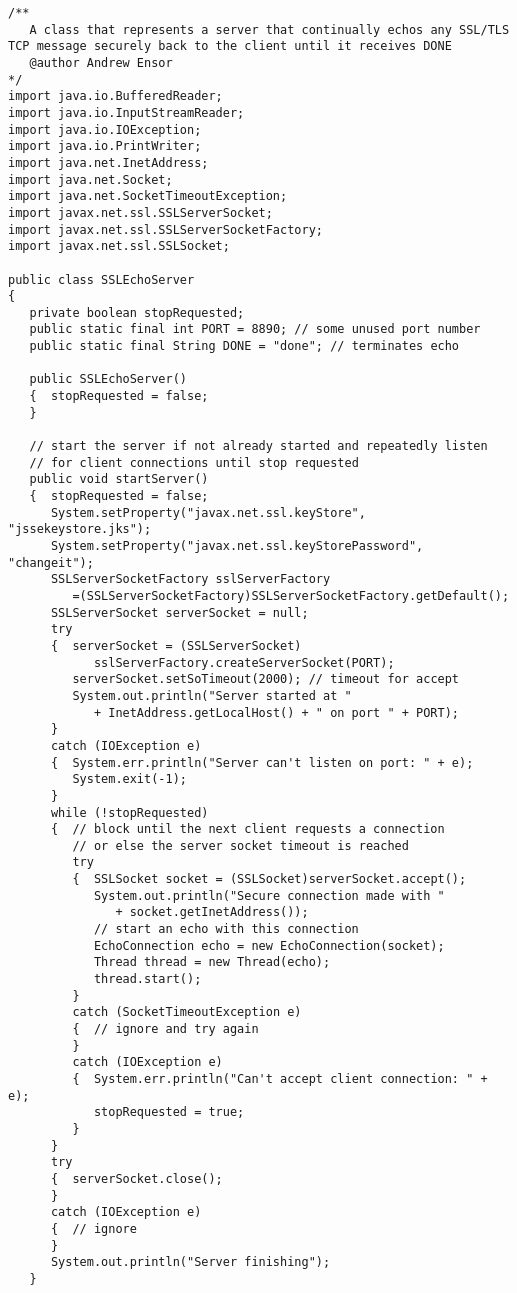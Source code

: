\begin{lstlisting}[caption=SSL/TLS TCP message echo]
/**
   A class that represents a server that continually echos any SSL/TLS TCP message securely back to the client until it receives DONE
   @author Andrew Ensor
*/
import java.io.BufferedReader;
import java.io.InputStreamReader;
import java.io.IOException;
import java.io.PrintWriter;
import java.net.InetAddress;
import java.net.Socket;
import java.net.SocketTimeoutException;
import javax.net.ssl.SSLServerSocket;
import javax.net.ssl.SSLServerSocketFactory;
import javax.net.ssl.SSLSocket;

public class SSLEchoServer
{
   private boolean stopRequested;
   public static final int PORT = 8890; // some unused port number
   public static final String DONE = "done"; // terminates echo

   public SSLEchoServer()
   {  stopRequested = false;
   }

   // start the server if not already started and repeatedly listen
   // for client connections until stop requested
   public void startServer()
   {  stopRequested = false;
      System.setProperty("javax.net.ssl.keyStore", "jssekeystore.jks");
      System.setProperty("javax.net.ssl.keyStorePassword", "changeit");
      SSLServerSocketFactory sslServerFactory
         =(SSLServerSocketFactory)SSLServerSocketFactory.getDefault();
      SSLServerSocket serverSocket = null;
      try
      {  serverSocket = (SSLServerSocket)
            sslServerFactory.createServerSocket(PORT);
         serverSocket.setSoTimeout(2000); // timeout for accept
         System.out.println("Server started at "
            + InetAddress.getLocalHost() + " on port " + PORT);
      }
      catch (IOException e)
      {  System.err.println("Server can't listen on port: " + e);
         System.exit(-1);
      }
      while (!stopRequested)
      {  // block until the next client requests a connection
         // or else the server socket timeout is reached
         try
         {  SSLSocket socket = (SSLSocket)serverSocket.accept();
            System.out.println("Secure connection made with "
               + socket.getInetAddress());
            // start an echo with this connection
            EchoConnection echo = new EchoConnection(socket);
            Thread thread = new Thread(echo);
            thread.start();
         }
         catch (SocketTimeoutException e)
         {  // ignore and try again
         }
         catch (IOException e)
         {  System.err.println("Can't accept client connection: " + e);
            stopRequested = true;
         }
      }
      try
      {  serverSocket.close();
      }
      catch (IOException e)
      {  // ignore
      }
      System.out.println("Server finishing");
   }


\end{lstlisting}
